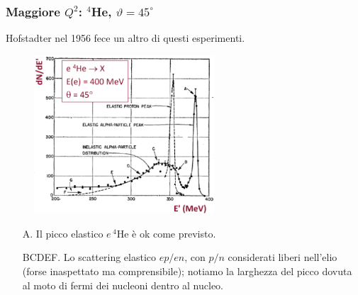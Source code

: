 \subsubsection{Maggiore $Q^2$: $^4$He, $\vartheta=45^\circ$}
Hofstadter nel 1956 fece un altro di questi esperimenti.
\begin{figure}[H]
    \centering
    \includegraphics[width=0.6\textwidth]{immagini/fig_higher_q2_helium.png}
\end{figure}
\begin{itemize}
    \item [A.] Il picco elastico $e\,^4$He è ok come previsto. 
    \item [BCDEF.] Lo scattering elastico $ep/en$, con $p/n$ considerati liberi nell'elio (forse inaspettato ma comprensibile); notiamo la larghezza del picco dovuta al moto di fermi dei nucleoni dentro al nucleo. 
\end{itemize}
